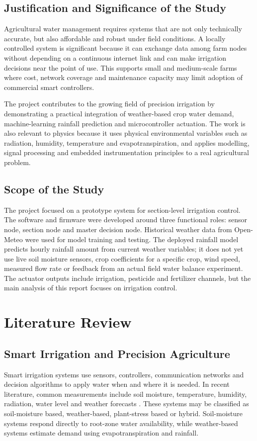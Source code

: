 \documentclass[12pt,a4paper]{report}
\begin{document}
\section{Justification and Significance of the Study}
Agricultural water management requires systems that are not only technically accurate, but also affordable and robust under field conditions. A locally controlled system is significant because it can exchange data among farm nodes without depending on a continuous internet link and can make irrigation decisions near the point of use. This supports small and medium-scale farms where cost, network coverage and maintenance capacity may limit adoption of commercial smart controllers.

The project contributes to the growing field of precision irrigation by demonstrating a practical integration of weather-based crop water demand, machine-learning rainfall prediction and microcontroller actuation. The work is also relevant to physics because it uses physical environmental variables such as radiation, humidity, temperature and evapotranspiration, and applies modelling, signal processing and embedded instrumentation principles to a real agricultural problem.

\section{Scope of the Study}
The project focused on a prototype system for section-level irrigation control. The software and firmware were developed around three functional roles: sensor node, section node and master decision node. Historical weather data from Open-Meteo were used for model training and testing. The deployed rainfall model predicts hourly rainfall amount from current weather variables; it does not yet use live soil moisture sensors, crop coefficients for a specific crop, wind speed, measured flow rate or feedback from an actual field water balance experiment. The actuator outputs include irrigation, pesticide and fertilizer channels, but the main analysis of this report focuses on irrigation control.

\chapter{Literature Review}

\section{Smart Irrigation and Precision Agriculture}
Smart irrigation systems use sensors, controllers, communication networks and decision algorithms to apply water when and where it is needed. In recent literature, common measurements include soil moisture, temperature, humidity, radiation, water level and weather forecasts \citep{garcia2020iot}. These systems may be classified as soil-moisture based, weather-based, plant-stress based or hybrid. Soil-moisture systems respond directly to root-zone water availability, while weather-based systems estimate demand using evapotranspiration and rainfall.
\end{document}
